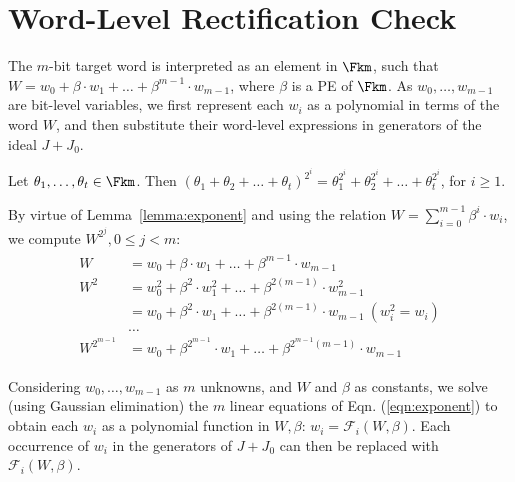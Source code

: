 \section{Word-Level Rectification Check}\label{sec:rcheck}


The $m$-bit target word is
interpreted as an element in $\Fkm$, such that $W = w_0 + \beta \cdot w_1 + \dots + \beta^{m-1} \cdot w_{m-1}$, 
where $\beta$ is a PE of $\Fkm$. As $w_0,\dots,w_{m-1}$ are bit-level variables, we first
represent each $w_i$ as a polynomial in terms of the word $W$, and
then substitute their word-level expressions in generators of the
ideal $J+J_0$. 

\begin{Lemma}
  \label{lemma:exponent}
Let $\theta_1,\dots,\theta_t \in \Fkm$. Then $(\theta_1+\theta_2+\dots+\theta_t)^{2^i} =
\theta_1^{2^i}+\theta_2^{2^i}+\dots+\theta_t^{2^i}$, for $i\geq 1$.
\end{Lemma}
By virtue of Lemma~\ref{lemma:exponent} and using the relation $W = \sum_{i=0}^{m-1}\beta^i \cdot w_i$, 
we compute $W^{2^j}, 0\leq j < m$: 
\begin{eqnarray}\label{eqn:exponent}
  \begin{split}
    W & = w_0 + \beta \cdot w_1 + \dots + \beta^{m-1} \cdot w_{m-1}\\
    W^2 & = w_0^2 + \beta^2 \cdot w_1^2 + \dots + \beta^{2(m-1)}\cdot w_{m-1}^2\\
        & = w_0 + \beta^2 \cdot w_1 + \dots + \beta^{2(m-1)} \cdot w_{m-1}
    ~(w_i^2=w_i)\\
    & \dots \\
    W^{2^{m-1}} & = w_0 + \beta^{2^{m-1}}\cdot w_1 + \dots + \beta^{2^{m-1}(m-1)}\cdot w_{m-1}
  \end{split}
\end{eqnarray}

Considering $w_0,\dots,w_{m-1}$ as $m$ unknowns, and $W$ and $\beta$
as constants, we solve (using Gaussian elimination) the
$m$ linear equations of Eqn. (\ref{eqn:exponent}) to obtain each $w_i$
as a polynomial function in $W, \beta$: $w_i =
\mathcal{F}_i(W,\beta)$. Each occurrence of $w_i$ in the generators of
$J+J_0$ can then be replaced with $\mathcal{F}_i(W,\beta)$. 

